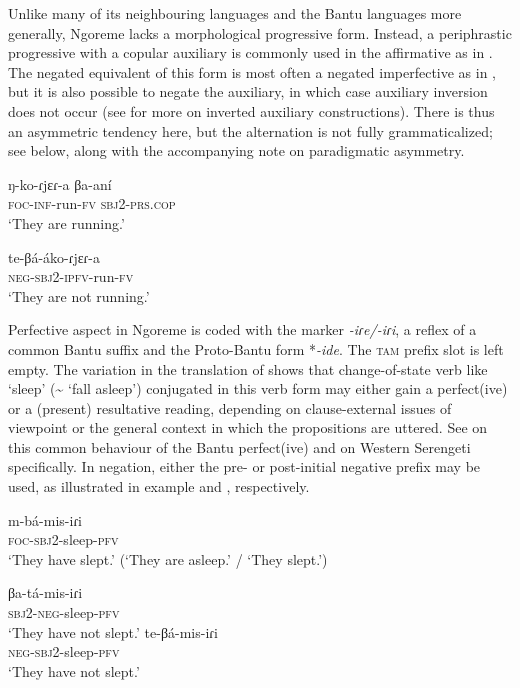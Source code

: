 \documentclass[output=paper,colorlinks,citecolor=brown,draftmode]{langscibook}
\begin{document}
Unlike many of its neighbouring languages and the Bantu languages more generally, Ngoreme lacks a morphological progressive form. Instead, a periphrastic progressive with a copular auxiliary is commonly used in the affirmative as in . The negated equivalent of this form is most often a negated imperfective as in , but it is also possible to negate the auxiliary, in which case auxiliary inversion does not occur (see  for more on inverted auxiliary constructions). There is thus an asymmetric tendency here, but the alternation is not fully grammaticalized; see  below, along with the accompanying note on paradigmatic asymmetry.

\ea\label{ex:ngo:8} 
    \gll ŋ-ko-ɾjɛɾ-a βa{}-aní\\ 
    \textsc{foc{}-inf}{}-run-\textsc{fv} \textsc{sbj}2-\textsc{prs.cop}
    \\
    \glt ‘They are running.’
\z 

\ea\label{ex:ngo:9} 
    \gll te-βá-áko-ɾjɛɾ-a\\ 
    \textsc{neg-sbj2-ipfv}{}-run-\textsc{fv}\\
    \glt ‘They are not running.’
\z 

Perfective aspect in Ngoreme is coded with the marker \textit{{}-iɾe/-iɾi}, a reflex of a common Bantu suffix and the Proto-Bantu form *\textit{{}-ide}. The \textsc{tam} prefix slot is left empty. The variation in the translation of  shows that change-of-state verb like ‘sleep’ ({\textasciitilde} ‘fall asleep’) conjugated in this verb form may either gain a perfect(ive) or a (present) resultative reading, depending on clause-external issues of viewpoint or the general context in which the propositions are uttered. See \citet{BotneForthcoming} on this common behaviour of the Bantu perfect(ive) and \citet[54–70]{Roth2018} on Western Serengeti specifically.
In negation, either the pre- or post-initial negative prefix may be used, as illustrated in example  and , respectively.

\ea\label{ex:ngo:10} 
    \gll m-bá-mis-iɾi\\ 
        \textsc{foc}{}-\textsc{sbj}2-sleep-\textsc{pfv}\\
    \glt ‘They have slept.’ (‘They are asleep.’ / ‘They slept.’)
\z 

\ea\label{ex:ngo:11}
    \ea\label{ex:ngo:11a}
        \gll βa-tá{}-mis-iɾi \\
         \textsc{sbj2-neg}{}-sleep-\textsc{pfv} \\
        \glt ‘They have not slept.’ 
    \ex\label{ex:ngo:11b}
        \gll te-βá-mis-iɾi\\
          \textsc{neg-sbj2}{}-sleep-\textsc{pfv}\\
        \glt ‘They have not slept.’ 
     \z
\z
\end{document}
